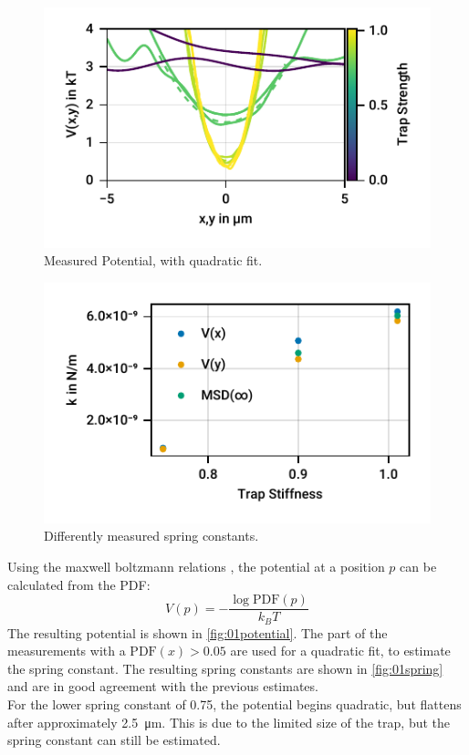 \documentclass[
    parskip=half, 
    twoside=false,
    twocolumn=true,
    fontsize=11pt,
]{scrarticle}
\begin{document}
\begin{figure}
    \centering
    \includegraphics{figures/01_03_3_axis.pdf}
    \caption{Measured Potential, with quadratic fit.}
    \label{fig:01potential}
\end{figure}
\begin{figure}
    \centering
    \includegraphics{figures/01_03_4_spring_constants.pdf}
    \caption{Differently measured spring constants.}
    \label{fig:01spring}
\end{figure}
Using the maxwell boltzmann relations \cite{instructions}, the potential at a position $p$ can be calculated from the PDF:
\begin{equation}
    V(p) = - \frac{\log{\text{PDF}(p)}}{k_B T}
\end{equation}
The resulting potential is shown in \autoref{fig:01potential}.
The part of the measurements with a $\text{PDF}(x)>0.05$ are used for a quadratic fit, to estimate the spring constant.
The resulting spring constants are shown in \autoref{fig:01spring} and are in good agreement with the previous estimates. \\
For the lower spring constant of \SI{0.75}{}, the potential begins quadratic, but flattens after approximately \SI{2.5}{\micro m}. 
This is due to the limited size of the trap, but the spring constant can still be estimated.
\end{document}
